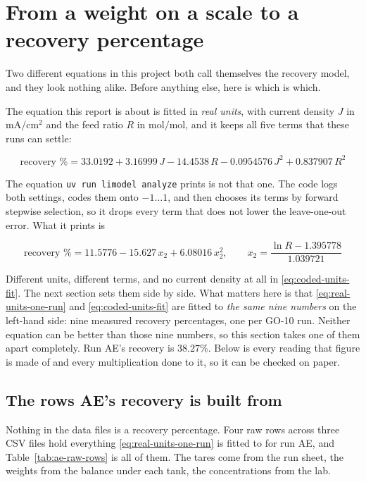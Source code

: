 \section{From a weight on a scale to a recovery percentage}

Two different equations in this project both call themselves the recovery model, and they
look nothing alike. Before anything else, here is which is which.

The equation this report is about is fitted in \emph{real units}, with current density $J$ in
$\mathrm{mA/cm^2}$ and the feed ratio $R$ in $\mathrm{mol/mol}$, and it keeps all five terms
that these runs can settle:

\begin{equation}
  \text{recovery \%} = 33.0192 + 3.16999\,J - 14.4538\,R - 0.0954576\,J^{2} + 0.837907\,R^{2}
  \label{eq:real-units-one-run}
\end{equation}

The equation \texttt{uv run limodel analyze} prints is not that one. The code logs both
settings, codes them onto $-1\ldots1$, and then chooses its terms by forward stepwise
selection, so it drops every term that does not lower the leave-one-out error. What it prints
is

\begin{equation}
  \text{recovery \%} = 11.5776 - 15.627\,x_{2} + 6.08016\,x_{2}^{2},
  \qquad x_{2} = \frac{\ln R - 1.395778}{1.039721}
  \label{eq:coded-units-fit}
\end{equation}

Different units, different terms, and no current density at all in \eqref{eq:coded-units-fit}.
The next section sets them side by side. What matters here is that
\eqref{eq:real-units-one-run} and \eqref{eq:coded-units-fit} are fitted to \emph{the same nine
numbers} on the left-hand side: nine measured recovery percentages, one per GO-10 run. Neither
equation can be better than those nine numbers, so this section takes one of them apart
completely. Run AE's recovery is $38.27\%$. Below is every reading that figure is made of and
every multiplication done to it, so it can be checked on paper.

\subsection{The rows AE's recovery is built from}

Nothing in the data files is a recovery percentage. Four raw rows across three CSV files hold
everything \eqref{eq:real-units-one-run} is fitted to for run AE, and Table~\ref{tab:ae-raw-rows}
is all of them. The tares come from the run sheet, the weights from the balance under each
tank, the concentrations from the lab.

